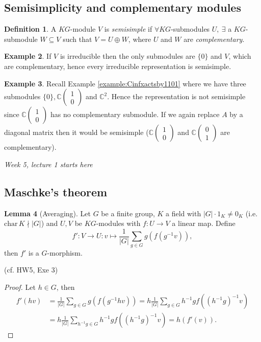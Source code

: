 \documentclass{article}
\newcommand{\Char}{\text{char}\,}
\newcommand{\C}{\mathbb{C}}
\theoremstyle{definition}
\newtheorem{defn}{Definition}[subsection]
\newtheorem{lemma}[defn]{Lemma}
\newtheorem{example}[defn]{Example}
\begin{document}
\subsection{Semisimplicity and complementary modules}
\begin{defn}
A $KG$-module $V$ is \textit{semisimple} if $\forall KG$-submodules $U,\ \exists$ a $KG$-submodule $W\subseteq V$ such that $V=U\oplus W$, where $U$ and $W$ are \textit{complementary}. 
\end{defn}

\begin{example}
If $V$ is irreducible then the only submodules are $\{0\}$ and $V$, which are complementary, hence every irreducible representation is semisimple.
\end{example}

\begin{example}
Recall Example \ref{example:Cinfxactsby1101} where we have three submodules $\{0\},\C\begin{pmatrix}1\\0\end{pmatrix}$ and $\C^2$. Hence the representation is not semisimple since $\C\begin{pmatrix}1\\0\end{pmatrix}$ has no complementary submodule. If we again replace $A$ by a diagonal matrix then it would be semisimple ($\C\begin{pmatrix}1\\0\end{pmatrix}$ and $\C\begin{pmatrix}0\\1\end{pmatrix}$ are complementary).
\end{example}

\begin{flushright}
\textit{Week 5, lecture 1 starts here}
\end{flushright}

\subsection{Maschke's theorem}
\begin{lemma}[Averaging]
Let $G$ be a finite group, $K$ a field with $|G|\cdot 1_K\neq 0_K$ (i.e. $\Char K\nmid |G|$) and $U,V$ be $KG$-modules with $f:U\rightarrow V$ a linear map. Define
\[
f':V\rightarrow U:v\mapsto \frac{1}{|G|}\sum_{g\in G} g\left(f\left(g^{-1}v\right)\right),
\]
then $f'$ is a $G$-morphism.

(cf. HW5, Exe 3)
\end{lemma}
\begin{proof}
Let $h\in G$, then
\[
\begin{aligned}
f'(hv)&=\frac{1}{|G|}\sum_{g\in G} g\left(f\left(g^{-1}hv\right)\right)=h\frac{1}{|G|}\sum_{g\in G} h^{-1} gf\left(\left(h^{-1}g\right)^{-1}v\right)\\
&=h\frac{1}{|G|}\sum_{h^{-1}g\in G} h^{-1} gf\left(\left(h^{-1}g\right)^{-1}v\right)=h(f'(v)).
\end{aligned}
\]
\end{proof}
\end{document}
